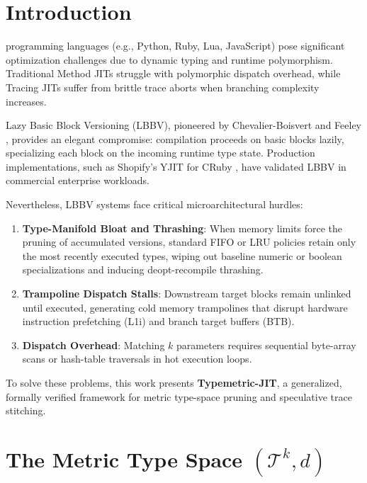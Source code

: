 \documentclass[10pt,journal,compsoc]{IEEEtran}
\begin{document}
\section{Introduction}
 programming languages (e.g., Python, Ruby, Lua, JavaScript) pose significant optimization challenges due to dynamic typing and runtime polymorphism. Traditional Method JITs struggle with polymorphic dispatch overhead, while Tracing JITs suffer from brittle trace aborts when branching complexity increases.

Lazy Basic Block Versioning (LBBV), pioneered by Chevalier-Boisvert and Feeley \cite{chevalier2016simple}, provides an elegant compromise: compilation proceeds on basic blocks lazily, specializing each block on the incoming runtime type state. Production implementations, such as Shopify's YJIT for CRuby \cite{chevalier2021yjit}, have validated LBBV in commercial enterprise workloads.

Nevertheless, LBBV systems face critical microarchitectural hurdles:
\begin{enumerate}
    \item \textbf{Type-Manifold Bloat and Thrashing}: When memory limits force the pruning of accumulated versions, standard FIFO or LRU policies retain only the most recently executed types, wiping out baseline numeric or boolean specializations and inducing deopt-recompile thrashing.
    \item \textbf{Trampoline Dispatch Stalls}: Downstream target blocks remain unlinked until executed, generating cold memory trampolines that disrupt hardware instruction prefetching (L1i) and branch target buffers (BTB).
    \item \textbf{Dispatch Overhead}: Matching $k$ parameters requires sequential byte-array scans or hash-table traversals in hot execution loops.
\end{enumerate}

To solve these problems, this work presents \textbf{Typemetric-JIT}, a generalized, formally verified framework for metric type-space pruning and speculative trace stitching.

\section{The Metric Type Space $(\mathcal{T}^k, d)$}
\end{document}
